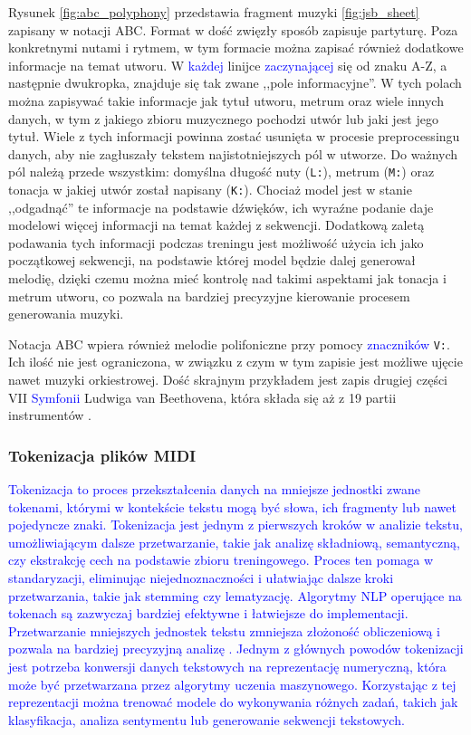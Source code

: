 \documentclass[data-science]{agh-wi} %
\begin{document}
Rysunek \ref*{fig:abc_polyphony} przedstawia fragment muzyki \ref*{fig:jsb_sheet} zapisany w notacji ABC. Format w dość zwięzły sposób zapisuje partyturę. Poza konkretnymi nutami i rytmem, w tym formacie można zapisać również dodatkowe informacje na temat utworu. W \textcolor{blue}{każdej} linijce \textcolor{blue}{zaczynającej} się od znaku A-Z, a następnie dwukropka, znajduje się tak zwane ,,pole informacyjne''. W tych polach można zapisywać takie informacje jak tytuł utworu, metrum oraz wiele innych danych, w tym z jakiego zbioru muzycznego pochodzi utwór lub jaki jest jego tytuł. Wiele z tych informacji powinna zostać usunięta w procesie preprocessingu danych, aby nie zagłuszały tekstem najistotniejszych pól w utworze. Do ważnych pól należą przede wszystkim: domyślna długość nuty (\texttt{L:}), metrum (\texttt{M:}) oraz tonacja w jakiej utwór został napisany (\texttt{K:}). Chociaż model jest w stanie ,,odgadnąć'' te informacje na podstawie dźwięków, ich wyraźne podanie daje modelowi więcej informacji na temat każdej z sekwencji. Dodatkową zaletą podawania tych informacji podczas treningu jest możliwość użycia ich jako początkowej sekwencji, na podstawie której model będzie dalej generował melodię, dzięki czemu można mieć kontrolę nad takimi aspektami jak tonacja i metrum utworu, co pozwala na bardziej precyzyjne kierowanie procesem generowania muzyki.

Notacja ABC wpiera również melodie polifoniczne przy pomocy \textcolor{blue}{znaczników} \texttt{V:}. Ich ilość nie jest ograniczona, w związku z czym w tym zapisie jest możliwe ujęcie nawet muzyki orkiestrowej. Dość skrajnym przykładem jest zapis drugiej części VII \textcolor{blue}{Symfonii} Ludwiga van Beethovena, która składa się aż z 19 partii instrumentów \cite{beethoven}.

\subsubsection*{Tokenizacja plików MIDI}\label{sec:REMI}
\textcolor{blue}{Tokenizacja to proces przekształcenia danych na mniejsze jednostki zwane tokenami, którymi w kontekście tekstu mogą być słowa, ich fragmenty lub nawet pojedyncze znaki. Tokenizacja jest jednym z pierwszych kroków w analizie tekstu, umożliwiającym dalsze przetwarzanie, takie jak analizę składniową, semantyczną, czy ekstrakcję cech na podstawie zbioru treningowego. Proces ten pomaga w standaryzacji, eliminując niejednoznaczności i ułatwiając dalsze kroki przetwarzania, takie jak stemming czy lematyzację. Algorytmy NLP operujące na tokenach są zazwyczaj bardziej efektywne i łatwiejsze do implementacji. Przetwarzanie mniejszych jednostek tekstu zmniejsza złożoność obliczeniową i pozwala na bardziej precyzyjną analizę \cite*{tokenizacja}. Jednym z głównych powodów tokenizacji jest potrzeba konwersji danych tekstowych na reprezentację numeryczną, która może być przetwarzana przez algorytmy uczenia maszynowego. Korzystając z tej reprezentacji można trenować modele do wykonywania różnych zadań, takich jak klasyfikacja, analiza sentymentu lub generowanie sekwencji tekstowych.}
\end{document}
